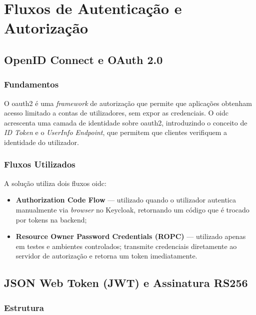 \chapter{Fluxos de Autenticação e Autorização}
\label{chap:autenticacao}

\section{OpenID Connect e OAuth 2.0}

\subsection{Fundamentos}

O \gls{oauth2} \cite{RFC6749} é uma \textit{framework} de autorização que permite que aplicações obtenham acesso limitado a contas de utilizadores, sem expor as credenciais. O \gls{oidc} \cite{OIDCCore} acrescenta uma camada de identidade sobre \gls{oauth2}, introduzindo o conceito de \textit{ID Token} e o \textit{UserInfo Endpoint}, que permitem que clientes verifiquem a identidade do utilizador.

\subsection{Fluxos Utilizados}

A solução utiliza dois fluxos \gls{oidc}:

\begin{itemize}
  \item \textbf{Authorization Code Flow} — utilizado quando o utilizador autentica manualmente via \textit{browser} no Keycloak, retornando um código que é trocado por tokens na backend;
  
  \item \textbf{Resource Owner Password Credentials (ROPC)} — utilizado apenas em testes e ambientes controlados; transmite credenciais diretamente ao servidor de autorização e retorna um token imediatamente.
\end{itemize}

\section{JSON Web Token (JWT) e Assinatura RS256}

\subsection{Estrutura}

